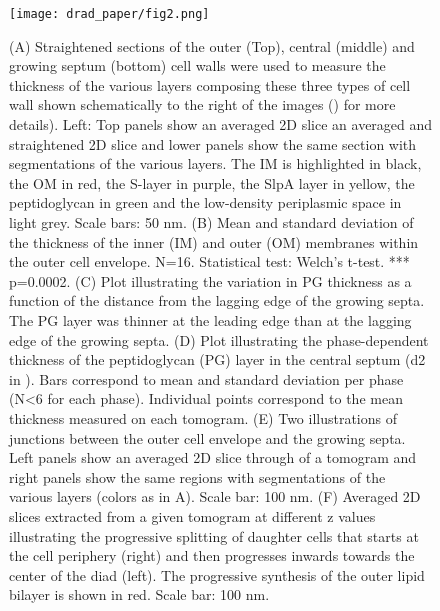 \begin{figure}
    \centering
    \texttt{[image: drad\_paper/fig2.png]}
    \label{drad_fig2}
\end{figure}
\begin{figure}
    \ContinuedFloat
    \caption[]{(A) Straightened sections of the outer (Top), central (middle) and growing septum (bottom) cell walls were used to measure the thickness of the various layers composing these three types of cell wall shown schematically to the right of the images () for more details). Left: Top panels show an averaged 2D slice an averaged and straightened 2D slice and lower panels show the same section with segmentations of the various layers. The IM is highlighted in black, the OM in red, the S-layer in purple, the SlpA layer in yellow, the peptidoglycan in green and the low-density periplasmic space in light grey. Scale bars: 50 nm. (B) Mean and standard deviation of the thickness of the inner (IM) and outer (OM) membranes within the outer cell envelope. N=16. Statistical test: Welch's t-test. *** p=0.0002. (C) Plot illustrating the variation in PG thickness as a function of the distance from the lagging edge of the growing septa. The PG layer was thinner at the leading edge than at the lagging edge of the growing septa. (D) Plot illustrating the phase-dependent thickness of the peptidoglycan (PG) layer in the central septum (d2 in ). Bars correspond to mean and standard deviation per phase (N<6 for each phase). Individual points correspond to the mean thickness measured on each tomogram. (E) Two illustrations of junctions between the outer cell envelope and the growing septa. Left panels show an averaged 2D slice through of a tomogram and right panels show the same regions with segmentations of the various layers (colors as in A). Scale bar: 100 nm. (F) Averaged 2D slices extracted from a given tomogram at different z values illustrating the progressive splitting of daughter cells that starts at the cell periphery (right) and then progresses inwards towards the center of the diad (left). The progressive synthesis of the outer lipid bilayer is shown in red. Scale bar: 100 nm.}
\end{figure}

